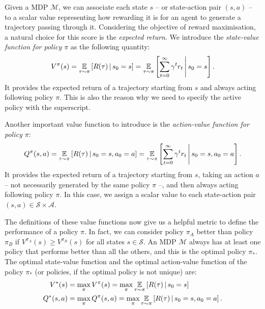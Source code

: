 Given a \acl{MDP} $\mathcal{M}$, we can associate each state $s$ -- or state-action pair $(s, a)$ -- to a scalar value representing how rewarding it is for an agent to generate a trajectory passing through it.
Considering the objective of reward maximisation, a natural choice for this score is the \emph{expected return}.
We introduce the \emph{state-value function for policy $\pi$} as the following quantity:
%
\begin{equation}
    \label{equation:state_value_function}
    V^\pi(s) 
    = \operatorname*{\mathbb{E}}_{\tau \sim \pi} \left[ R(\tau) \operatorname{\mid} s_0 = s \right]
    = \operatorname*{\mathbb{E}}_{\tau \sim \pi} \left[ \sum_{t=0}^\infty \gamma^t r_t \,\middle\vert\, s_0 = s \right] .
\end{equation}
%
It provides the expected return of a trajectory starting from $s$ and always acting following policy $\pi$.
This is also the reason why we need to specify the active policy with the superscript.

Another important value function to introduce is the \emph{action-value function for policy $\pi$}:
%
\begin{equation}
    \label{equation:action_value_function}
    Q^\pi(s, a) 
    = \operatorname*{\mathbb{E}}_{\tau \sim \pi} \left[ R(\tau) \operatorname{\mid} s_0 = s, a_0 = a \right]
    = \operatorname*{\mathbb{E}}_{\tau \sim \pi} \left[ \sum_{t=0}^\infty \gamma^t r_t \,\middle\vert\, s_0 = s, a_0 = a \right] .
\end{equation}
%
It provides the expected return of a trajectory starting from $s$, taking an action $a$ -- not necessarily generated by the same policy $\pi$ --, and then always acting following policy $\pi$.
In this case, we assign a scalar value to each state-action pair $(s, a) \in \mathcal{S} \times \mathcal{A}$.

The definitions of these value functions now give us a helpful metric to define the performance of a policy $\pi$.
In fact, we can consider policy $\pi_A$ better than policy $\pi_B$ if $V^{\pi_A}(s) \geq V^{\pi_B}(s)$ for all states $s \in \mathcal{S}$.
An \ac{MDP} $\mathcal{M}$ always has at least one policy that performs better than all the others, and this is the optimal policy $\pi_*$.
The optimal state-value function and the optimal action-value function of the policy $\pi_*$ (or policies, if the optimal policy is not unique) are:
%
\begin{align*}
    V^*(s) 
    &= \max_\pi V^\pi(s)
    = \max_\pi \operatorname*{\mathbb{E}}_{\tau \sim \pi} \left[ R(\tau) \operatorname{\mid} s_0 = s \right] \\
    Q^*(s, a)
    &= \max_\pi Q^\pi(s, a)
    = \max_\pi \operatorname*{\mathbb{E}}_{\tau \sim \pi} \left[ R(\tau) \operatorname{\mid} s_0 = s, a_0 = a \right] .
\end{align*}

